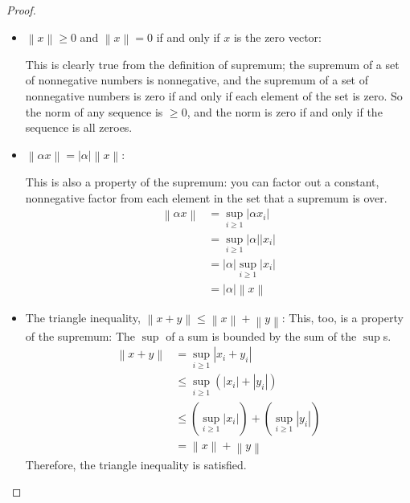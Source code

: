 \documentclass[12pt]{article}
\theoremstyle{definition}
\begin{document}
\begin{proof}
\begin{enumerate}[label=(\roman*)]
		\begin{itemize}
		    \item $\left \lVert x \right \rVert \geq 0$ and $\left \lVert x \right \rVert = 0$ if and only if $x$ is the zero vector:
		    \par This is clearly true from the definition of supremum; the supremum of a set of nonnegative numbers is nonnegative, and the supremum of a set of nonnegative numbers is zero if and only if each element of the set is zero. So the norm of any sequence is $\geq 0$, and the norm is zero if and only if the sequence is all zeroes.
		\item $\left \lVert \alpha x \right \rVert = \left \lvert \alpha \right \rvert \left \lVert x \right \rVert$:
		\par This is also a property of the supremum: you can factor out a constant, nonnegative factor from each element in the set that a supremum is over.
        \begin{align*}
            \left \lVert \alpha x \right \rVert &= \sup_{i \geq 1} \left \lvert \alpha x_i \right \rvert\\
            &= \sup_{i\geq 1} \left \lvert \alpha \right \rvert  \left \lvert x_i \right \rvert\\
            &= \left \lvert \alpha \right \rvert \sup_{i\geq 1} \left \lvert x_i \right \rvert\\
            &= \left \lvert \alpha \right \rvert \left \lVert x \right \rVert
        \end{align*}
        \item The triangle inequality, $\left \lVert x + y \right \rVert \leq \left \lVert x \right \rVert + \left \lVert y \right \rVert$:
        This, too, is a property of the supremum: The $\sup$ of a sum is bounded by the sum of the $\sup$s.
        \begin{align*}
            \left \lVert x + y \right \rVert &= \sup_{i \geq 1} \left \lvert x_i + y_i \right \rvert\\
            &\leq \sup_{i \geq 1} \left ( \left \lvert x_i \right \rvert + \left \lvert y_i \right \rvert \right )\\
            &\leq \left ( \sup_{i \geq 1} \left \lvert x_i \right \rvert \right ) + \left ( \sup_{i \geq 1} \left \lvert y_i \right \rvert \right )\\
            &= \left \lVert x \right \rVert + \left \lVert y \right \rVert
        \end{align*}
        Therefore, the triangle inequality is satisfied.

\end{itemize}
\end{enumerate}
\end{proof}
\end{document}
